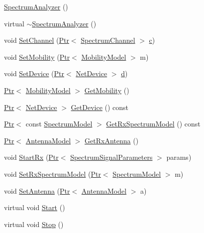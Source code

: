 \begin{DoxyCompactItemize}
\item 
\hyperlink{classns3_1_1SpectrumAnalyzer_a233bf0300a8b44edf2f4102df14bbd21}{Spectrum\+Analyzer} ()
\item 
virtual \hyperlink{classns3_1_1SpectrumAnalyzer_a6ed109a21b8ace1a65b7fa76d08a6388}{$\sim$\+Spectrum\+Analyzer} ()
\item 
void \hyperlink{classns3_1_1SpectrumAnalyzer_a4120d67bb3bc0c3f8054ff4ec40b7b00}{Set\+Channel} (\hyperlink{classns3_1_1Ptr}{Ptr}$<$ \hyperlink{classns3_1_1SpectrumChannel}{Spectrum\+Channel} $>$ \hyperlink{mmwave_2model_2fading-traces_2fading__trace__generator_8m_ae0323a9039add2978bf5b49550572c7c}{c})
\item 
void \hyperlink{classns3_1_1SpectrumAnalyzer_a20c8431763896b9385c9e8f0600a42c9}{Set\+Mobility} (\hyperlink{classns3_1_1Ptr}{Ptr}$<$ \hyperlink{classns3_1_1MobilityModel}{Mobility\+Model} $>$ m)
\item 
void \hyperlink{classns3_1_1SpectrumAnalyzer_a16ba669b2605114333461125c667bc7d}{Set\+Device} (\hyperlink{classns3_1_1Ptr}{Ptr}$<$ \hyperlink{classns3_1_1NetDevice}{Net\+Device} $>$ \hyperlink{lte__pathloss_8m_a1aabac6d068eef6a7bad3fdf50a05cc8}{d})
\item 
\hyperlink{classns3_1_1Ptr}{Ptr}$<$ \hyperlink{classns3_1_1MobilityModel}{Mobility\+Model} $>$ \hyperlink{classns3_1_1SpectrumAnalyzer_a3936e42ba642cd9adc0ca0abef5f42d0}{Get\+Mobility} ()
\item 
\hyperlink{classns3_1_1Ptr}{Ptr}$<$ \hyperlink{classns3_1_1NetDevice}{Net\+Device} $>$ \hyperlink{classns3_1_1SpectrumAnalyzer_a8433d2c25a77271ecc7aab9c0c108069}{Get\+Device} () const 
\item 
\hyperlink{classns3_1_1Ptr}{Ptr}$<$ const \hyperlink{classns3_1_1SpectrumModel}{Spectrum\+Model} $>$ \hyperlink{classns3_1_1SpectrumAnalyzer_a9dd0a36fb3d4c134df0c252f29a02d9a}{Get\+Rx\+Spectrum\+Model} () const 
\item 
\hyperlink{classns3_1_1Ptr}{Ptr}$<$ \hyperlink{classns3_1_1AntennaModel}{Antenna\+Model} $>$ \hyperlink{classns3_1_1SpectrumAnalyzer_a763e2ec0745c1a63d233ee8bf1de5a44}{Get\+Rx\+Antenna} ()
\item 
void \hyperlink{classns3_1_1SpectrumAnalyzer_a53e7653b1e80117e239f2fee268c1225}{Start\+Rx} (\hyperlink{classns3_1_1Ptr}{Ptr}$<$ \hyperlink{structns3_1_1SpectrumSignalParameters}{Spectrum\+Signal\+Parameters} $>$ params)
\item 
void \hyperlink{classns3_1_1SpectrumAnalyzer_a01c17745a773ac9462b4df4b23d248af}{Set\+Rx\+Spectrum\+Model} (\hyperlink{classns3_1_1Ptr}{Ptr}$<$ \hyperlink{classns3_1_1SpectrumModel}{Spectrum\+Model} $>$ m)
\item 
void \hyperlink{classns3_1_1SpectrumAnalyzer_a190185a2963f56093f2ac298e78e0bb4}{Set\+Antenna} (\hyperlink{classns3_1_1Ptr}{Ptr}$<$ \hyperlink{classns3_1_1AntennaModel}{Antenna\+Model} $>$ a)
\item 
virtual void \hyperlink{classns3_1_1SpectrumAnalyzer_a0576e43ca1e4630370d6d5952ea30bd5}{Start} ()
\item 
virtual void \hyperlink{classns3_1_1SpectrumAnalyzer_a1b3ae341cb6be9df4af39f9fe3196d1a}{Stop} ()
\end{DoxyCompactItemize}
